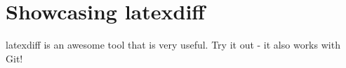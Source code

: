 \documentclass[12pt]{article}
\begin{document}
\section{Showcasing latexdiff}

latexdiff is an awesome tool that is very useful. Try it out - it also works with Git! 
\end{document}
